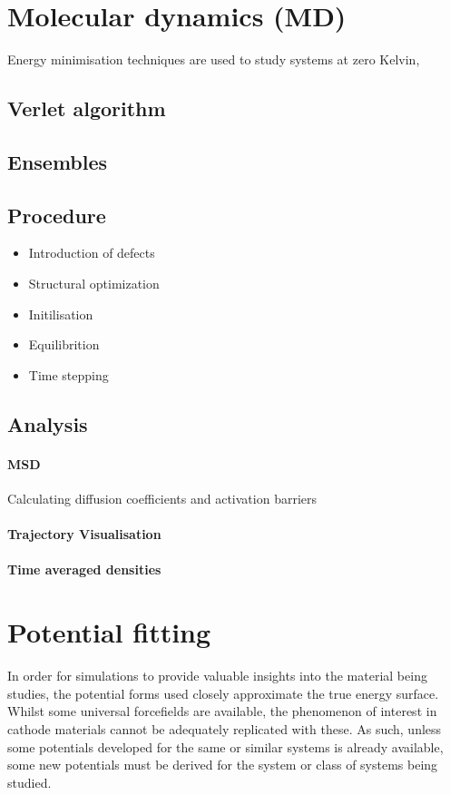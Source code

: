 \section{{\color{red}Molecular dynamics (MD)}}
\label{sec:MD}
Energy minimisation techniques are used to study systems at zero Kelvin, 

\subsection{Verlet algorithm}

\subsection{Ensembles}

\subsection{Procedure}
\begin{itemize}
	\item Introduction of defects
	\item Structural optimization
	\item Initilisation
	\item Equilibrition
	\item Time stepping
\end{itemize}
\subsection{Analysis}
\paragraph{MSD}
Calculating diffusion coefficients and activation barriers
\paragraph{Trajectory Visualisation}
\paragraph{Time averaged densities}


\newpage
\section{{\color{red}Potential fitting}}
In order for simulations to provide valuable insights into the material being studies, the potential forms used closely approximate the true energy surface.
Whilst some universal forcefields are available, the phenomenon of interest in cathode materials cannot be adequately replicated with these.
As such, unless some potentials developed for the same or similar systems is already available, some new potentials must be derived for the system or class of systems being studied.

